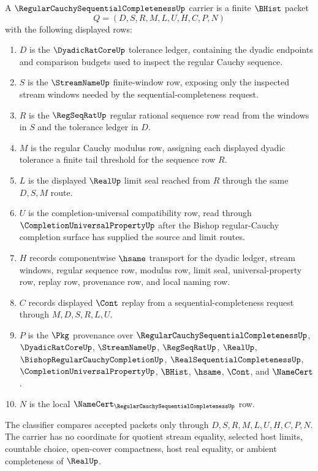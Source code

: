 \begin{definition}
\label{def:regular-cauchy-sequential-completeness-carrier}
A $\RegularCauchySequentialCompletenessUp$ carrier is a finite $\BHist$ packet
$$
Q=(D,S,R,M,L,U,H,C,P,N)
$$
with the following displayed rows:
\begin{enumerate}
\item $D$ is the $\DyadicRatCoreUp$ tolerance ledger, containing the dyadic endpoints and comparison budgets used to inspect the regular Cauchy sequence.
\item $S$ is the $\StreamNameUp$ finite-window row, exposing only the inspected stream windows needed by the sequential-completeness request.
\item $R$ is the $\RegSeqRatUp$ regular rational sequence row read from the windows in $S$ and the tolerance ledger in $D$.
\item $M$ is the regular Cauchy modulus row, assigning each displayed dyadic tolerance a finite tail threshold for the sequence row $R$.
\item $L$ is the displayed $\RealUp$ limit seal reached from $R$ through the same $D,S,M$ route.
\item $U$ is the completion-universal compatibility row, read through $\CompletionUniversalPropertyUp$ after the Bishop regular-Cauchy completion surface has supplied the source and limit routes.
\item $H$ records componentwise $\hsame$ transport for the dyadic ledger, stream windows, regular sequence row, modulus row, limit seal, universal-property row, replay row, provenance row, and local naming row.
\item $C$ records displayed $\Cont$ replay from a sequential-completeness request through $M,D,S,R,L,U$.
\item $P$ is the $\Pkg$ provenance over $\RegularCauchySequentialCompletenessUp$, $\DyadicRatCoreUp$, $\StreamNameUp$, $\RegSeqRatUp$, $\RealUp$, $\BishopRegularCauchyCompletionUp$, $\RealSequentialCompletenessUp$, $\CompletionUniversalPropertyUp$, $\BHist$, $\hsame$, $\Cont$, and $\NameCert$.
\item $N$ is the local $\NameCert_{\RegularCauchySequentialCompletenessUp}$ row.
\end{enumerate}
The classifier compares accepted packets only through $D,S,R,M,L,U,H,C,P,N$. The carrier has no coordinate for quotient stream equality, selected host limits, countable choice, open-cover compactness, host real equality, or ambient completeness of $\RealUp$.
\end{definition}

